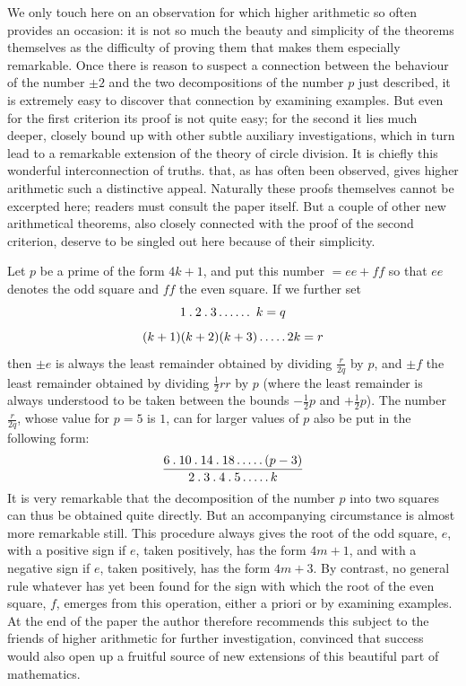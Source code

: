 We only touch here on an observation for which higher arithmetic so often provides an occasion: it is not so much the beauty and simplicity of the theorems themselves as the difficulty of proving them that makes them especially remarkable. Once there is reason to suspect a connection between the behaviour of the number $\pm2$ and the two decompositions of the number $p$ just described, it is extremely easy to discover that connection by examining examples. But even for the first criterion its proof is not quite easy; for the second it lies much deeper, closely bound up with other subtle auxiliary investigations, which in turn lead to a remarkable extension of the theory of circle division. It is chiefly this wonderful interconnection of truths. that, as has often been observed, gives higher arithmetic such a distinctive appeal. Naturally these proofs themselves cannot be excerpted here; readers must consult the paper itself. But a couple of other new arithmetical theorems, also closely connected with the proof of the second criterion, deserve to be singled out here because of their simplicity.

Let $p$ be a prime of the form $4k+1$, and put this number $=ee+ff$
%
so that $ee$ denotes the odd square and $ff$ the even square. If we further set
\[
1\pdot2\pdot3\mathinner{.\,.\,.\,.\,.\,.}\ k=q
\]
\[
(k+1)(k+2)(k+3)\mathinner{.\,.\,.\,.\,.}2k=r
\]
then $\pm e$ is always the least remainder obtained by dividing $\frac r{2q}$ by $p$, and $\pm f$ the least remainder obtained by dividing $\frac12rr$ by $p$ (where the least remainder is always understood to be taken between the bounds $-\frac12p$ and $+\frac12p$). The number $\frac r{2q}$, whose value for $p=5$ is $1$, can for larger values of $p$ also be put in the following form:
\[
\frac{6\mathbin{.}10\mathbin{.}14\mathbin{.}18\mathinner{.\,.\,.\,.\,.}(p-3)}{2\mathbin{.}3\mathbin{.}4\mathbin{.}5\mathinner{.\,.\,.\,.\,.} k}
\]
It is very remarkable that the decomposition of the number $p$ into two squares can thus be obtained quite directly. But an accompanying circumstance is almost more remarkable still. This procedure always gives the root of the odd square, $e$, with a positive sign if $e$, taken positively, has the form $4m+1$, and with a negative sign if $e$, taken positively, has the form $4m+3$. By contrast, no general rule whatever has yet been found for the sign with which the root of the even square, $f$, emerges from this operation, either a priori or by examining examples. At the end of the paper the author therefore recommends this subject to the friends of higher arithmetic for further investigation, convinced that success would also open up a fruitful source of new extensions of this beautiful part of mathematics.
